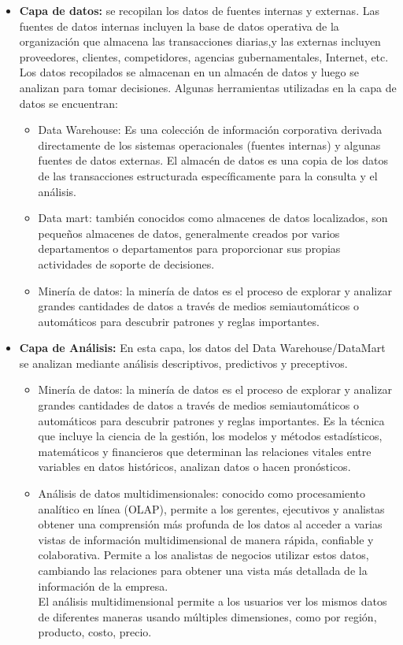 \documentclass[preprint,12pt]{elsarticle}
\begin{document}
	\begin{itemize}
	\item \textbf{Capa de datos:} se recopilan los datos de fuentes internas y externas. Las fuentes de datos internas incluyen la base de datos operativa de la organización que almacena las transacciones diarias,y las externas incluyen proveedores, clientes, competidores, agencias gubernamentales, Internet, etc. Los datos recopilados se almacenan en un almacén de datos y luego se analizan para tomar decisiones.
	Algunas herramientas utilizadas en la capa de datos se encuentran:
		\begin{itemize}
		\item  Data Warehouse: Es una colección de información corporativa derivada directamente de los sistemas operacionales (fuentes internas) y algunas fuentes de datos externas. El almacén de datos es una copia de los datos de las transacciones estructurada específicamente para la consulta y el análisis. 
		\item Data mart: también conocidos como almacenes de datos localizados, son pequeños almacenes de datos, generalmente creados por varios departamentos o departamentos para proporcionar sus propias actividades de soporte de decisiones.
		\item Minería de datos: la minería de datos es el proceso de explorar y analizar grandes cantidades de datos a través de medios semiautomáticos o automáticos para descubrir patrones y reglas importantes.
		\end{itemize}

	\item \textbf{Capa de Análisis:} En esta capa, los datos del Data Warehouse/DataMart se analizan mediante análisis descriptivos, predictivos y preceptivos.
		\begin{itemize}
		\item Minería de datos: la minería de datos es el proceso de explorar y analizar grandes cantidades de datos a través de medios semiautomáticos o automáticos para descubrir patrones y reglas importantes. Es la técnica que incluye la ciencia de la gestión, los modelos y métodos estadísticos, matemáticos y financieros que determinan las relaciones vitales entre variables en datos históricos, analizan datos o hacen pronósticos.
		\item Análisis de datos multidimensionales: conocido como procesamiento analítico en línea (OLAP), permite a los gerentes, ejecutivos y analistas obtener una comprensión más profunda de los datos al acceder a varias vistas de información multidimensional de manera rápida, confiable y colaborativa. Permite a los analistas de negocios utilizar estos datos, cambiando las relaciones para obtener una vista más detallada de la información de la empresa. \\El análisis multidimensional permite a los usuarios ver los mismos datos de diferentes maneras usando múltiples dimensiones, como por región, producto, costo, precio.
		\end{itemize}


\end{itemize}
\end{document}

